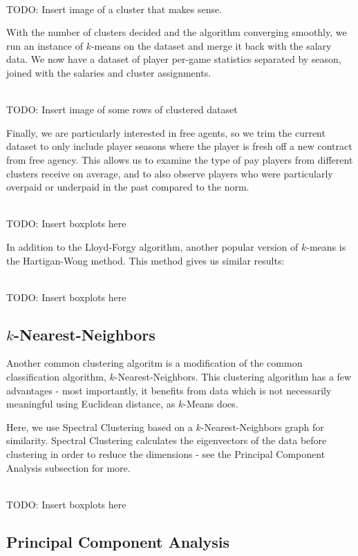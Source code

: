 \documentclass[letterpaper]{article}
\begin{document}
\\TODO: Insert image of a cluster that makes sense.

With the number of clusters decided and the algorithm converging smoothly, we run an instance of $k$-means on the dataset and merge it back with the salary data. We now have a dataset of player per-game statistics separated by season, joined with the salaries and cluster assignments.

\\TODO: Insert image of some rows of clustered dataset

Finally, we are particularly interested in free agents, so we trim the current dataset to only include player seasons where the player is fresh off a new contract from free agency. This allows us to examine the type of pay players from different clusters receive on average, and to also observe players who were particularly overpaid or underpaid in the past compared to the norm.

\\TODO: Insert boxplots here

In addition to the Lloyd-Forgy algorithm, another popular version of $k$-means is the Hartigan-Wong method. This method gives us similar results:

\\TODO: Insert boxplots here

\subsection{$k$-Nearest-Neighbors}

Another common clustering algoritm is a modification of the common classification algorithm, $k$-Nearest-Neighbors. This clustering algorithm has a few advantages - most importantly, it benefits from data which is not necessarily meaningful using Euclidean distance, as $k$-Means does.

Here, we use Spectral Clustering based on a $k$-Nearest-Neighbors graph for similarity. Spectral Clustering calculates the eigenvectors of the data before clustering in order to reduce the dimensions - see the Principal Component Analysis subsection for more.

\\TODO: Insert boxplots here

\subsection{Principal Component Analysis}
\end{document}
